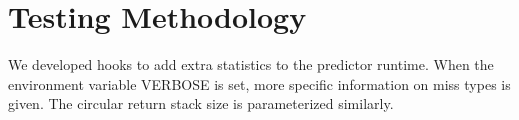 \section{Testing Methodology}
We developed hooks to add extra statistics to the predictor runtime. When the environment variable VERBOSE is set, more specific information on miss types is given. The circular return stack size is parameterized similarly.

